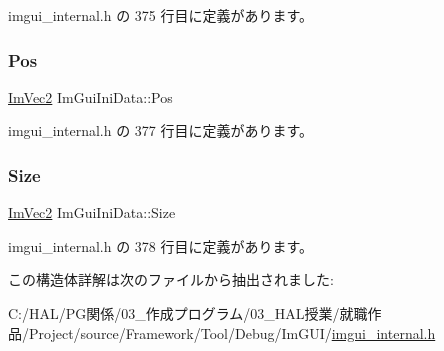  imgui\+\_\+internal.\+h の 375 行目に定義があります。

\mbox{\label{struct_im_gui_ini_data_a8598c0d937901fc22f808f11f9aa6bac}} 
\subsubsection{\texorpdfstring{Pos}{Pos}}
{\footnotesize\ttfamily \mbox{\hyperlink{struct_im_vec2}{Im\+Vec2}} Im\+Gui\+Ini\+Data\+::\+Pos}



 imgui\+\_\+internal.\+h の 377 行目に定義があります。

\mbox{\label{struct_im_gui_ini_data_af3d56b3e89c45d07d7927ab95dbd86fa}} 
\subsubsection{\texorpdfstring{Size}{Size}}
{\footnotesize\ttfamily \mbox{\hyperlink{struct_im_vec2}{Im\+Vec2}} Im\+Gui\+Ini\+Data\+::\+Size}



 imgui\+\_\+internal.\+h の 378 行目に定義があります。



この構造体詳解は次のファイルから抽出されました\+:\begin{DoxyCompactItemize}
\item 
C\+:/\+H\+A\+L/\+P\+G関係/03\+\_\+作成プログラム/03\+\_\+\+H\+A\+L授業/就職作品/\+Project/source/\+Framework/\+Tool/\+Debug/\+Im\+G\+U\+I/\mbox{\hyperlink{imgui__internal_8h}{imgui\+\_\+internal.\+h}}\end{DoxyCompactItemize}
